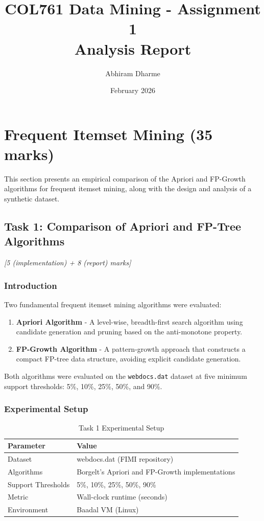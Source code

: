 \documentclass[11pt,a4paper]{article}
\title{COL761 Data Mining - Assignment 1\\Analysis Report}
\author{Abhiram Dharme}
\date{February 2026}
\begin{document}
\maketitle

\tableofcontents
\newpage

\section{Frequent Itemset Mining (35 marks)}

This section presents an empirical comparison of the Apriori and FP-Growth algorithms for frequent itemset mining, along with the design and analysis of a synthetic dataset.

\subsection{Task 1: Comparison of Apriori and FP-Tree Algorithms}
\textit{[5 (implementation) + 8 (report) marks]}

\subsubsection{Introduction}

Two fundamental frequent itemset mining algorithms were evaluated:
\begin{enumerate}
    \item \textbf{Apriori Algorithm} - A level-wise, breadth-first search algorithm using candidate generation and pruning based on the anti-monotone property.
    \item \textbf{FP-Growth Algorithm} - A pattern-growth approach that constructs a compact FP-tree data structure, avoiding explicit candidate generation.
\end{enumerate}

Both algorithms were evaluated on the \texttt{webdocs.dat} dataset at five minimum support thresholds: 5\%, 10\%, 25\%, 50\%, and 90\%.

\subsubsection{Experimental Setup}

\begin{table}[H]
\centering
\begin{tabular}{ll}
\toprule
\textbf{Parameter} & \textbf{Value} \\
\midrule
Dataset & webdocs.dat (FIMI repository) \\
Algorithms & Borgelt's Apriori and FP-Growth implementations \\
Support Thresholds & 5\%, 10\%, 25\%, 50\%, 90\% \\
Metric & Wall-clock runtime (seconds) \\
Environment & Baadal VM (Linux) \\
\bottomrule
\end{tabular}
\caption{Task 1 Experimental Setup}
\end{table}
\end{document}
